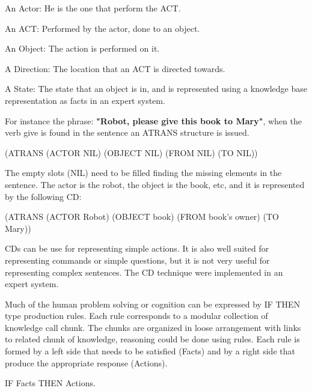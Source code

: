 \documentclass{llncs}
\begin{document}
	An Actor: He is the one that perform the ACT.
\vspace{.01 in}

	An ACT: Performed by the actor, done to an object.
\vspace{.01 in}

	An Object: The action is performed on it.
\vspace{.01 in}

	A Direction: The location that an ACT is directed towards.
\vspace{.01 in}

	A State: The state that an object is in, and is represented using a knowledge base representation as
facts in an expert system. 
\vspace{.01 in}

	For instance the phrase: {\bf "Robot, please give this book to Mary"}, 
when the verb give is found in the sentence an ATRANS structure is issued.
\vspace{.01 in}

	(ATRANS (ACTOR NIL) (OBJECT NIL) (FROM NIL) (TO NIL))
\vspace{.01 in}

The empty slots (NIL) need to be filled finding the missing elements in the sentence. The actor is the robot, the 
object is the book, etc, and it is represented by the following CD:
\vspace{.01 in}

	(ATRANS (ACTOR Robot) (OBJECT book) (FROM book's owner) (TO Mary))
\vspace{.01 in}


CDs can be use for representing simple actions. It is also well suited for representing commands or simple questions, but it is not very useful for representing complex sentences.
The CD technique were implemented in an expert system.


Much of the human problem solving or cognition can be expressed by IF THEN type production rules. Each rule corresponds to a modular collection of knowledge call chunk. The chunks are organized in loose arrangement with links to related chunk of knowledge, reasoning could be done using rules. 
Each rule is formed by a left side that needs to be satisfied (Facts) and by a right side that produce the appropriate response (Actions).  
\vspace{.01 in}

		IF  Facts  THEN  Actions.
\vspace{.01 in}
\end{document}
